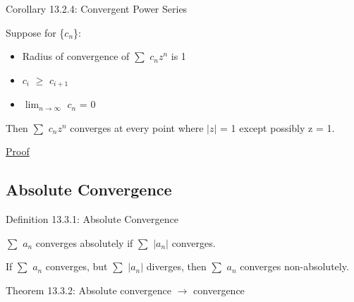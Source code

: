 { \color{orange} Corollary 13.2.4: Convergent Power Series }

    \begin{adjustbox}{minipage=14cm, right, vspace=0.1cm 0cm}
        Suppose for \{$c_n$\}:

        \begin{itemize}[leftmargin=1cm, itemsep=0.1cm]
            \item Radius of convergence of $\sum$ $c_n z^n$ is 1
            
            \item $c_i$ $\geq$ $c_{i+1}$
            
            \item $\lim_{n \rightarrow \infty}$ $c_n$ = 0
        \end{itemize}

        Then $\sum$ $c_n z^n$ converges at every point where $|z|$ = 1
        except possibly z = 1.
    \end{adjustbox}

{ \color{magenta} \underline{Proof} }






\subsection{ Absolute Convergence }

{ \color{blue} Definition 13.3.1: Absolute Convergence }

    \begin{adjustbox}{minipage=14cm, right, vspace=0.1cm 0cm}
        $\sum$ $a_n$ converges absolutely if $\sum$ $|a_n|$ converges.

        If $\sum$ $a_n$ converges, but $\sum$ $|a_n|$ diverges,
        then $\sum$ $a_n$ converges non-absolutely.
    \end{adjustbox}

    \vspace{0.5cm}

{ \color{red} Theorem 13.3.2: Absolute convergence $\rightarrow$ convergence }

